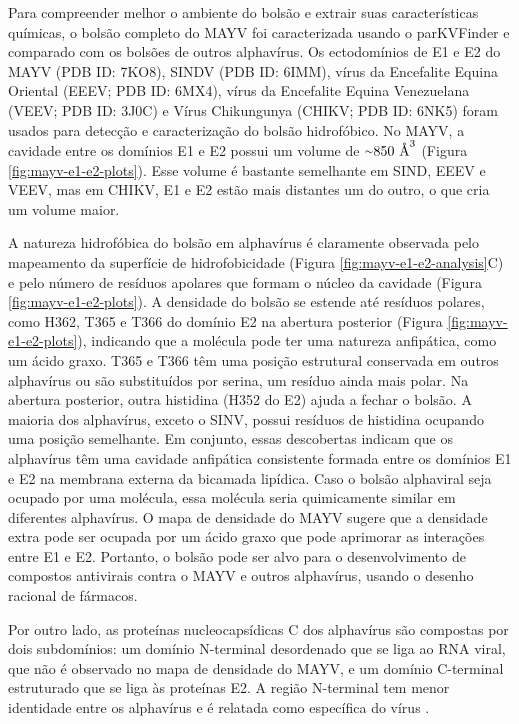\documentclass[Portugues]{phdquali}
\newcommand{\mAA}{~\text{\AA}}
\newcommand{\aproximadamente}{\raise.2ex\hbox{$\scriptstyle\sim$}}
\begin{document}
Para compreender melhor o ambiente do bolsão e extrair suas características químicas, o bolsão completo do MAYV foi caracterizada usando o parKVFinder \cite{guerra2020} e comparado com os bolsões de outros alphavírus. Os ectodomínios de E1 e E2 do MAYV (PDB ID: 7KO8), SINDV (PDB ID: 6IMM), vírus da Encefalite Equina Oriental (EEEV; PDB ID: 6MX4), vírus da Encefalite Equina Venezuelana (VEEV; PDB ID: 3J0C) e Vírus Chikungunya (CHIKV; PDB ID: 6NK5) foram usados para detecção e caracterização do bolsão hidrofóbico. No MAYV, a cavidade entre os domínios E1 e E2 possui um volume de $\aproximadamente850 \mAA^3$ (Figura \ref{fig:mayv-e1-e2-plots}). Esse volume é bastante semelhante em SIND, EEEV e VEEV, mas em CHIKV, E1 e E2 estão mais distantes um do outro, o que cria um volume maior.

A natureza hidrofóbica do bolsão em alphavírus é claramente observada pelo mapeamento da superfície de hidrofobicidade (Figura \ref{fig:mayv-e1-e2-analysis}C) e pelo número de resíduos apolares que formam o núcleo da cavidade (Figura \ref{fig:mayv-e1-e2-plots}). A densidade do bolsão se estende até resíduos polares, como H362, T365 e T366 do domínio E2 na abertura posterior (Figura \ref{fig:mayv-e1-e2-plots}), indicando que a molécula pode ter uma natureza anfipática, como um ácido graxo. T365 e T366 têm uma posição estrutural conservada em outros alphavírus ou são substituídos por serina, um resíduo ainda mais polar. Na abertura posterior, outra histidina (H352 do E2) ajuda a fechar o bolsão. A maioria dos alphavírus, exceto o SINV, possui resíduos de histidina ocupando uma posição semelhante. Em conjunto, essas descobertas indicam que os alphavírus têm uma cavidade anfipática consistente formada entre os domínios E1 e E2 na membrana externa da bicamada lipídica. Caso o bolsão alphaviral seja ocupado por uma molécula, essa molécula seria quimicamente similar em diferentes alphavírus. O mapa de densidade do MAYV sugere que a densidade extra pode ser ocupada por um ácido graxo que pode aprimorar as interações entre E1 e E2. Portanto, o bolsão pode ser alvo para o desenvolvimento de compostos antivirais contra o MAYV e outros alphavírus, usando o desenho racional de fármacos.

Por outro lado, as proteínas nucleocapsídicas C dos alphavírus são compostas por dois subdomínios: um domínio N-terminal desordenado que se liga ao RNA viral, que não é observado no mapa de densidade do MAYV, e um domínio C-terminal estruturado que se liga às proteínas E2. A região N-terminal tem menor identidade entre os alphavírus e é relatada como específica do vírus \cite{ribeiro2021}.
\end{document}
